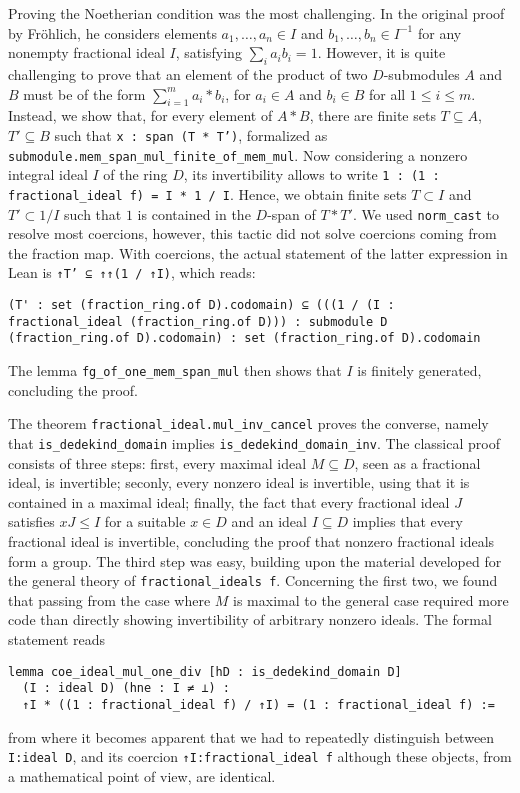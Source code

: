 \documentclass[a4paper,USenglish,cleveref, autoref, thm-restate]{lipics-v2021}
\newcommand{\lean}[1]{\texttt{#1}\xspace} %
\begin{document}
Proving the Noetherian condition was the most challenging. In the original proof by Fr\"ohlich, he considers elements $a_1, \dots, a_n \in I$ and $b_1, \dots, b_n \in I^{-1}$ for any nonempty fractional ideal $I$,
satisfying $ \sum_i a_i b_i = 1 $.
However, it is quite challenging to prove that an element of the product of two $D$-submodules $A$ and $B$ must be of the form $\sum_{i = 1}^m a_i*b_i$, for $a_i \in A$ and $b_i \in B$ for all $1 \leq i \leq m$.
Instead, we show that, for every element of $A\ast B$, there are finite sets $T\subseteq A$, $T'\subseteq B$ such that \lean{x : span (T * T')}, formalized as %
\lean{submodule.mem\_span\_mul\_finite\_of\_mem\_mul}.
Now considering a nonzero integral ideal $I$ of the ring $D$, its invertibility allows to write \lean{1 : (1 : fractional\_ideal f) = I * 1 / I}. Hence, we obtain 
finite sets $T \subset I$ and $T' \subset 1/I$ such that $1$ is contained in the $D$-span of $T*T'$. We used \lean{norm\_cast} to resolve most coercions, however, this tactic did not solve coercions coming from the fraction map. With coercions, the actual statement of the latter expression in Lean is \lean{↑T' ⊆ ↑↑(1 / ↑I)}, which reads:
\begin{lstlisting}
(T' : set (fraction_ring.of D).codomain) ⊆ (((1 / (I : fractional_ideal (fraction_ring.of D))) : submodule D (fraction_ring.of D).codomain) : set (fraction_ring.of D).codomain
\end{lstlisting}
The lemma \lean{fg\_of\_one\_mem\_span\_mul} then shows that $I$ is finitely generated, concluding the proof.

The theorem \lean{fractional\_ideal.mul\_inv\_cancel} proves the converse, namely that \lean{is\_dedekind\_domain} implies \lean{is\_dedekind\_domain\_inv}. The classical proof consists of three steps: first, every maximal ideal $M\subseteq D$, seen as a fractional ideal, is invertible; seconly, every nonzero ideal is invertible, using that it is contained in a maximal ideal; finally, the fact that every fractional ideal $J$ satisfies $xJ\leq I$ for a suitable $x\in D$ and an ideal $I\subseteq D$ implies that every fractional ideal is invertible, concluding the proof that nonzero fractional ideals form a group. The third step was easy, building upon the material developed for the general theory of \lean{fractional\_ideals f}. Concerning the first two, we found that passing from the case where $M$ is maximal to the general case required more code than directly showing invertibility of arbitrary nonzero ideals. The formal statement reads
\begin{lstlisting}
lemma coe_ideal_mul_one_div [hD : is_dedekind_domain D] 
  (I : ideal D) (hne : I ≠ ⊥) :
  ↑I * ((1 : fractional_ideal f) / ↑I) = (1 : fractional_ideal f) :=
\end{lstlisting}
from where it becomes apparent that we had to repeatedly distinguish between \lean{I:ideal D}, and its coercion \lean{↑I:fractional\_ideal f} although these objects, from a mathematical point of view, are identical.
\end{document}
